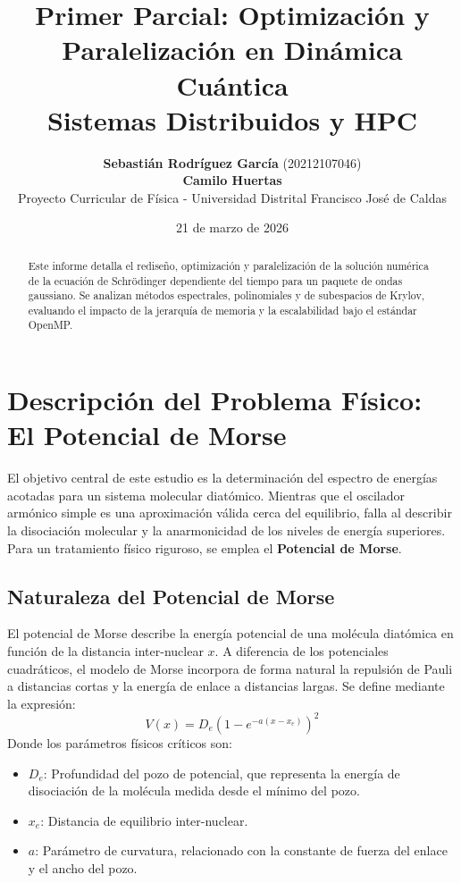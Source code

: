 \documentclass[11pt,fleqn]{article}
\title{Primer Parcial: Optimización y Paralelización en Dinámica Cuántica \\ \Large{Sistemas Distribuidos y HPC}}
\author{\textbf{Sebastián Rodríguez García} (20212107046) \\ \textbf{Camilo Huertas} \\ \small{Proyecto Curricular de Física - Universidad Distrital Francisco José de Caldas}}
\date{21 de marzo de 2026}
\begin{document}
\maketitle

\begin{abstract}
Este informe detalla el rediseño, optimización y paralelización de la solución numérica de la ecuación de Schrödinger dependiente del tiempo para un paquete de ondas gaussiano. Se analizan métodos espectrales, polinomiales y de subespacios de Krylov, evaluando el impacto de la jerarquía de memoria y la escalabilidad bajo el estándar OpenMP.
\end{abstract}


\section{Descripción del Problema Físico: El Potencial de Morse}

El objetivo central de este estudio es la determinación del espectro de energías acotadas para un sistema molecular diatómico. Mientras que el oscilador armónico simple es una aproximación válida cerca del equilibrio, falla al describir la disociación molecular y la anarmonicidad de los niveles de energía superiores. Para un tratamiento físico riguroso, se emplea el \textbf{Potencial de Morse}.

\subsection{Naturaleza del Potencial de Morse}

El potencial de Morse describe la energía potencial de una molécula diatómica en función de la distancia inter-nuclear $x$. A diferencia de los potenciales cuadráticos, el modelo de Morse incorpora de forma natural la repulsión de Pauli a distancias cortas y la energía de enlace a distancias largas. Se define mediante la expresión:
\begin{equation}
    V(x) = D_e \left( 1 - e^{-a(x-x_e)} \right)^2
\end{equation}
Donde los parámetros físicos críticos son:
\begin{itemize}
    \item $D_e$: Profundidad del pozo de potencial, que representa la energía de disociación de la molécula medida desde el mínimo del pozo.
    \item $x_e$: Distancia de equilibrio inter-nuclear.
    \item $a$: Parámetro de curvatura, relacionado con la constante de fuerza del enlace y el ancho del pozo.
\end{itemize}
\end{document}
